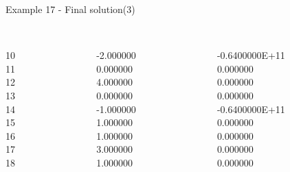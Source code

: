\begin{frame}{Example 17 - Final solution(3)}
\footnotesize
\begin{columns}[t]
\begin{column}{0.3\textwidth}
\\
10\\
11\\
12\\
13\\
14\\
15\\
16\\
17\\
18\\

\end{column}
\begin{column}{0.3\textwidth}
\\
-2.000000\\
0.000000\\
4.000000\\
0.000000\\
-1.000000\\
1.000000\\
1.000000\\
3.000000\\
1.000000\\

\end{column}  

\begin{column}{0.3\textwidth}
\\
-0.6400000E+11\\
0.000000\\
0.000000\\
0.000000\\
-0.6400000E+11\\
0.000000\\
0.000000\\
0.000000\\
0.000000\\

\end{column}
\end{columns}
\end{frame}
